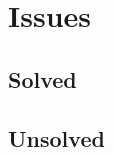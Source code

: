 \documentclass[10pt, a4paper]{article}
\begin{document}
\section{Issues}
\subsection{Solved}
\subsection{Unsolved}




\begin{figure}[!htbp]
	\centering
\end{figure}
\end{document}
